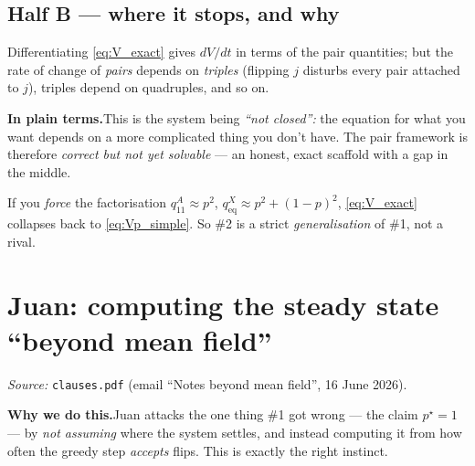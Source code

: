 \documentclass[11pt]{article}
\newcommand{\plain}[1]{%
  \par\smallskip\noindent
  \colorbox{yellow!18}{\parbox{\dimexpr\linewidth-2\fboxsep}{%
  \textbf{In plain terms.}\quad #1}}\par\smallskip}
\newcommand{\why}[1]{%
  \par\smallskip\noindent
  \colorbox{blue!8}{\parbox{\dimexpr\linewidth-2\fboxsep}{%
  \textbf{Why we do this.}\quad #1}}\par\smallskip}
\begin{document}
\subsection{Half B --- where it stops, and why}
Differentiating \eqref{eq:V_exact} gives $dV/dt$ in terms of the pair quantities; but the rate of
change of \emph{pairs} depends on \emph{triples} (flipping $j$ disturbs every pair attached to
$j$), triples depend on quadruples, and so on.
\plain{This is the system being \emph{``not closed'':} the equation for what you want depends on a
more complicated thing you don't have. The pair framework is therefore \emph{correct but not yet
solvable} --- an honest, exact scaffold with a gap in the middle.}
If you \emph{force} the factorisation $q^{A}_{11}\approx p^2$, $q^{X}_{\text{eq}}\approx p^2+(1-p)^2$,
\eqref{eq:V_exact} collapses back to \eqref{eq:Vp_simple}. So \#2 is a strict \emph{generalisation}
of \#1, not a rival.

\section{Juan: computing the steady state ``beyond mean field''}
\emph{Source: }\texttt{clauses.pdf} (email ``Notes beyond mean field'', 16 June 2026).

\why{Juan attacks the one thing \#1 got wrong --- the claim $p^\star=1$ --- by \emph{not assuming}
where the system settles, and instead computing it from how often the greedy step \emph{accepts}
flips. This is exactly the right instinct.}
\end{document}
